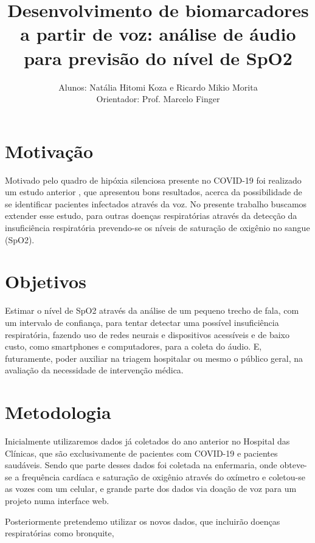 \documentclass[12pt, a4paper]{article}
\begin{document}
\title{Desenvolvimento de biomarcadores a partir de voz: análise de áudio para previsão do nível de SpO2}

\author{Alunos: Natália Hitomi Koza e Ricardo Mikio Morita \\ Orientador: Prof. Marcelo Finger}
\maketitle

\section{Motivação}

Motivado pelo quadro de hipóxia silenciosa presente no COVID-19 foi realizado um estudo anterior \citep{casanova2021deep}, que apresentou bons resultados, acerca da possibilidade de se identificar pacientes infectados através da voz. No presente trabalho buscamos extender esse estudo, para outras doenças respiratórias através da detecção da insuficiência respiratória prevendo-se os níveis de saturação de oxigênio no sangue (SpO2).


\section{Objetivos}

Estimar o nível de SpO2 através da análise de um pequeno trecho de fala, com um intervalo de confiança, para tentar detectar uma possível insuficiência respiratória, fazendo uso de redes neurais e dispositivos acessíveis e de baixo custo, como smartphones e computadores, para a coleta do áudio. E, futuramente, poder auxiliar na triagem hospitalar ou mesmo o público geral, na avaliação da necessidade de intervenção médica.

\section{Metodologia}

Inicialmente utilizaremos dados já coletados do ano anterior no Hospital das Clínicas, que são exclusivamente de pacientes com COVID-19 e pacientes saudáveis. Sendo que parte desses dados foi coletada na enfermaria, onde obteve-se a frequência cardíaca e saturação de oxigênio através do oxímetro e coletou-se as vozes com um celular, e grande parte dos dados via doação de voz para um projeto numa interface web.

Posteriormente pretendemo utilizar os novos dados, que incluirão doenças respiratórias como bronquite,
\end{document}
